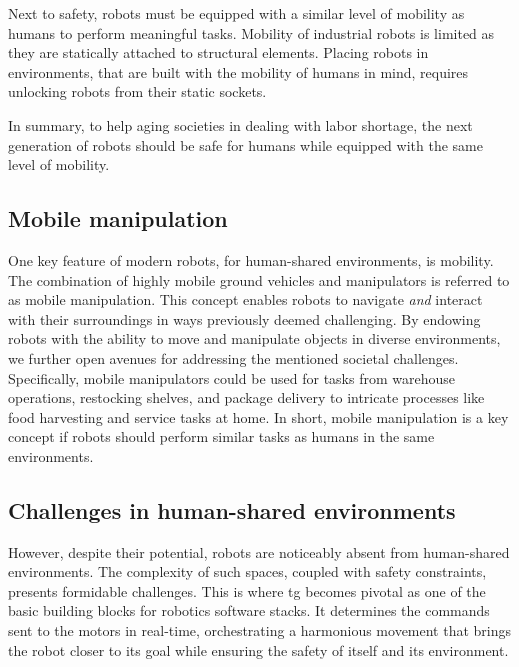 Next to
safety, robots must be equipped with a similar level of
mobility as humans to perform meaningful tasks. Mobility of
industrial robots is limited as they are statically
attached to structural elements.
Placing
robots in environments, that are built with the mobility of
humans in mind, requires unlocking robots from their static
sockets.

In summary, to help aging societies in dealing with labor
shortage, the next generation of robots should be safe for
humans while equipped with the same level of mobility.

\subsection*{Mobile manipulation}
\label{sub:mobile_manipulation}

One key feature of modern robots, for human-shared
environments, is mobility. The combination of highly mobile
ground vehicles and manipulators is referred to as mobile
manipulation. This concept enables robots to navigate
\textit{and}
interact with their surroundings in ways previously deemed
challenging. By endowing robots with the ability to move and
manipulate objects in diverse environments, we further open
avenues for addressing the mentioned societal challenges.
Specifically, mobile manipulators could be used for tasks
from warehouse operations, restocking shelves, and package
delivery to intricate processes like food harvesting and
service tasks at home.
In short, mobile manipulation is a key concept if robots
should perform similar tasks as humans in the same
environments.


\subsection*{Challenges in human-shared environments}
\label{sub:challenges_in_human_shared_environments}
%
However, despite their potential, robots are noticeably
absent from human-shared environments. The complexity of
such spaces, coupled with safety constraints, presents
formidable challenges. This is where \ac{tg}
becomes pivotal as one of the basic building blocks for
robotics software stacks. It determines the commands sent to
the motors in real-time, orchestrating a harmonious movement
that brings the robot closer to its goal while ensuring the
safety of itself and its environment.

